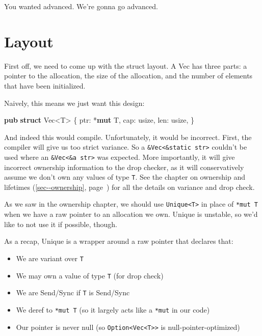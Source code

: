 \documentclass[a4paper,]{book}
\renewcommand*{\hyperlink}[2]{%
 #2 (\autoref{#1}, page~\pageref{#1})}
\newenvironment{Shaded}{\begin{snugshade}}{\end{snugshade}}
\newcommand{\KeywordTok}[1]{\textcolor[rgb]{0.13,0.29,0.53}{\textbf{{#1}}}}
\newcommand{\DataTypeTok}[1]{\textcolor[rgb]{0.13,0.29,0.53}{{#1}}}
\newcommand{\NormalTok}[1]{{#1}}
\providecommand{\tightlist}{%
  \setlength{\itemsep}{0pt}\setlength{\parskip}{0pt}}
\begin{document}
You wanted advanced. We're gonna go advanced.

\section{Layout}\label{sec--vec-layout}

First off, we need to come up with the struct layout. A Vec has three
parts: a pointer to the allocation, the size of the allocation, and the
number of elements that have been initialized.

Naively, this means we just want this design:

\begin{Shaded}
\begin{Highlighting}[]
\KeywordTok{pub} \KeywordTok{struct} \DataTypeTok{Vec}\NormalTok{<T> \{}
    \NormalTok{ptr: *}\KeywordTok{mut} \NormalTok{T,}
    \NormalTok{cap: }\DataTypeTok{usize}\NormalTok{,}
    \NormalTok{len: }\DataTypeTok{usize}\NormalTok{,}
\NormalTok{\}}
\end{Highlighting}
\end{Shaded}

And indeed this would compile. Unfortunately, it would be incorrect.
First, the compiler will give us too strict variance. So a
\texttt{\&Vec\textless{}\&\textquotesingle{}static\ str\textgreater{}}
couldn't be used where an
\texttt{\&Vec\textless{}\&\textquotesingle{}a\ str\textgreater{}} was
expected. More importantly, it will give incorrect ownership information
to the drop checker, as it will conservatively assume we don't own any
values of type \texttt{T}. See \protect\hyperlink{sec--ownership}{the
chapter on ownership and lifetimes} for all the details on variance and
drop check.

As we saw in the ownership chapter, we should use
\texttt{Unique\textless{}T\textgreater{}} in place of \texttt{*mut\ T}
when we have a raw pointer to an allocation we own. Unique is unstable,
so we'd like to not use it if possible, though.

As a recap, Unique is a wrapper around a raw pointer that declares that:

\begin{itemize}
\tightlist
\item
  We are variant over \texttt{T}
\item
  We may own a value of type \texttt{T} (for drop check)
\item
  We are Send/Sync if \texttt{T} is Send/Sync
\item
  We deref to \texttt{*mut\ T} (so it largely acts like a \texttt{*mut}
  in our code)
\item
  Our pointer is never null (so
  \texttt{Option\textless{}Vec\textless{}T\textgreater{}\textgreater{}}
  is null-pointer-optimized)
\end{itemize}
\end{document}

